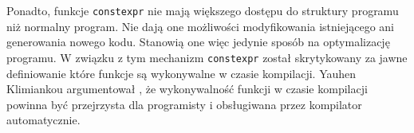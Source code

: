 Ponadto, funkcje \lstinline{constexpr} nie mają większego dostępu do struktury programu niż normalny program. Nie dają one możliwości modyfikowania istniejącego ani generowania nowego kodu. Stanowią one więc jedynie sposób na optymalizację programu.
W związku z tym mechanizm \lstinline{constexpr} został skrytykowany za jawne definiowanie które funkcje są wykonywalne w czasie kompilacji.
Yauhen Klimiankou argumentował \cite{Klimiankou:contexpr_great_good_wrong_idea}, że wykonywalność funkcji w czasie kompilacji powinna być przejrzysta dla programisty i obsługiwana przez kompilator automatycznie.
